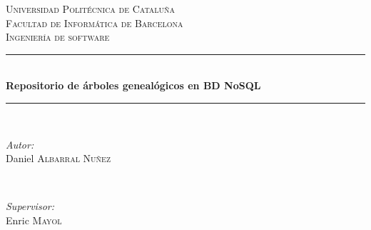 \documentclass[12pt]{article} %
\begin{document}
\begin{titlepage}

\newcommand{\HRule}{\rule{\linewidth}{0.5mm}} %

\center %
 

\textsc{\LARGE Universidad Politécnica de Cataluña}\\[1.5cm] %
\textsc{\Large Facultad de Informática de Barcelona}\\[0.5cm] %
\textsc{\large Ingeniería de software}\\[0.5cm] %


\HRule \\[0.4cm]
{ \huge \bfseries Repositorio de árboles genealógicos en BD NoSQL}\\[0.4cm] %
\HRule \\[1.5cm]
 

\begin{minipage}{0.4\textwidth}
\begin{flushleft} \large
\emph{Autor:}\\
Daniel \textsc{Albarral Nuñez} %
\end{flushleft}
\end{minipage}
~
\begin{minipage}{0.4\textwidth}
\begin{flushright} \large
\emph{Supervisor:} \\
Enric \textsc{Mayol} %
\end{flushright}
\end{minipage}\\[4cm]



\end{titlepage}
\end{document}
